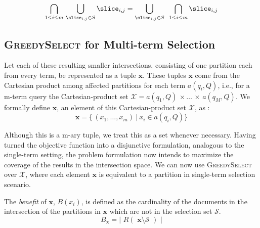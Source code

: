 $$
\bigcap_{1 \leq i \leq m}\,\bigcup_{\slice_{i,j} \in \mathcal{S}}{\slice_{i,j}} =  \bigcup_{\slice_{i,j} \in \mathcal{S}} \,\ \bigcap_{1 \leq i \leq m}{\slice_{i,j}} 
$$

\subsection {\textsc{GreedySelect} for Multi-term Selection}
\label{sec:multi-term-selection-solution}

 Let each of these resulting smaller intersections, consisting of one partition each from every term, be represented as a tuple $\mathbf{x}$. These tuples $\mathbf{x}$ come from the Cartesian product  among affected partitions for each term $a(q_i, Q)$, i.e., for a m-term query the Cartesian-product set $\mathcal{X} = a(q_1, Q) \, \times \ldots \, \times \,a(q_M, Q) $. We formally define $\mathbf{x}$, an element of this Cartesian-product set  $\mathcal{X}$, as :
$$
\mathbf{x} = \{ \, ( x_1, \ldots, x_m ) ~|~ x_i \in a(q_i, Q) \}
$$
 
Although this is a m-ary tuple, we treat this as a set whenever necessary. Having turned the objective function into a disjunctive formulation, analogous to the single-term setting, the problem formulation now intends to maximize the coverage of the results in the intersection space. We can now use \textsc{GreedySelect} over $\mathcal{X}$, where each element $\mathbf{x}$ is equivalent to a partition in single-term selection scenario. 

The \emph{benefit} of $\mathbf{x}$, $B(x_i)$, is defined as the cardinality of the documents in the intersection of the partitions in $\mathbf{x}$ which are not in the selection set $\mathcal{S}$. 
$$
  B_\mathbf{x} = \left| \,\,R\left(\,\, \mathbf{x} \setminus \mathcal{S}  \,\, \right)\,\, \right| 
$$

